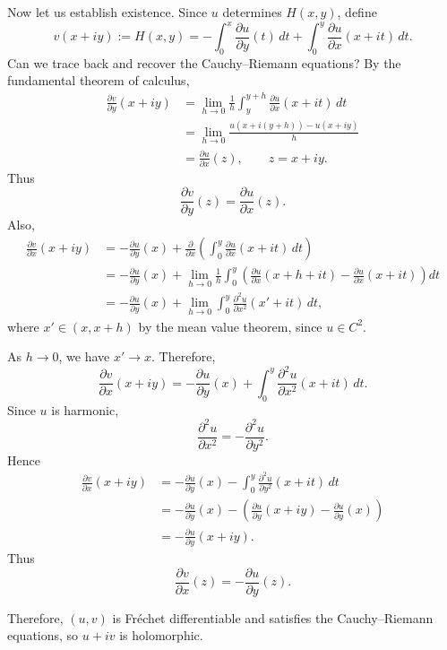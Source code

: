 \documentclass[11pt,a4paper]{article}
\begin{document}
Now let us establish existence. Since $u$ determines $H(x,y)$, define
\[
v(x+iy):=H(x,y)
=-\int_0^x\frac{\partial u}{\partial y}(t)\,dt
+\int_0^y\frac{\partial u}{\partial x}(x+it)\,dt.
\]
Can we trace back and recover the Cauchy--Riemann equations? By the fundamental theorem of calculus,
\begin{align*}
\frac{\partial v}{\partial y}(x+iy)
&=\lim_{h\to0}\frac1h
\int_y^{y+h}\frac{\partial u}{\partial x}(x+it)\,dt\\
&=\lim_{h\to0}
\frac{u(x+i(y+h))-u(x+iy)}{h}\\
&=\frac{\partial u}{\partial x}(z),
\qquad z=x+iy.
\end{align*}
Thus
\[
\frac{\partial v}{\partial y}(z)
=\frac{\partial u}{\partial x}(z).
\]
Also,
\begin{align*}
\frac{\partial v}{\partial x}(x+iy)
&=-\frac{\partial u}{\partial y}(x)
+\frac{\partial}{\partial x}
\left(\int_0^y\frac{\partial u}{\partial x}(x+it)\,dt\right)\\
&=-\frac{\partial u}{\partial y}(x)
+\lim_{h\to0}\frac1h\int_0^y
\left(
\frac{\partial u}{\partial x}(x+h+it)
-\frac{\partial u}{\partial x}(x+it)
\right)dt\\
&=-\frac{\partial u}{\partial y}(x)
+\lim_{h\to0}\int_0^y
\frac{\partial^2u}{\partial x^2}(x'+it)\,dt,
\end{align*}
where $x'\in(x,x+h)$ by the mean value theorem, since $u\in C^2$.


As $h\to0$, we have $x'\to x$. Therefore,
\[
\frac{\partial v}{\partial x}(x+iy)
=-\frac{\partial u}{\partial y}(x)
+\int_0^y\frac{\partial^2u}{\partial x^2}(x+it)\,dt.
\]
Since $u$ is harmonic,
\[
\frac{\partial^2u}{\partial x^2}
=-\frac{\partial^2u}{\partial y^2}.
\]
Hence
\begin{align*}
\frac{\partial v}{\partial x}(x+iy)
&=-\frac{\partial u}{\partial y}(x)
-\int_0^y\frac{\partial^2u}{\partial y^2}(x+it)\,dt\\
&=-\frac{\partial u}{\partial y}(x)
-\left(
\frac{\partial u}{\partial y}(x+iy)
-\frac{\partial u}{\partial y}(x)
\right)\\
&=-\frac{\partial u}{\partial y}(x+iy).
\end{align*}
Thus
\[
\frac{\partial v}{\partial x}(z)
=-\frac{\partial u}{\partial y}(z).
\]

Therefore, $(u,v)$ is Fr\'echet differentiable and satisfies the Cauchy--Riemann equations, so $u+iv$ is holomorphic.
\end{document}
